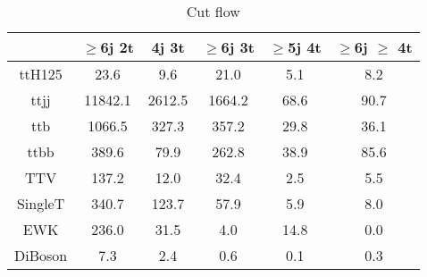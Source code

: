 \documentclass{article}
\begin{document}
        \begin{table*}[htbp]
        \begin{center}
\label{tab:cutflow}
\scriptsize{
\begin{tabular}{| c| c| c| c| c| c| }
\hline
 & $\ge$6j 2t  & 4j 3t  & $\ge$6j 3t  & $\ge$5j 4t  & $\ge$6j $\ge$ 4t \\ \hline
ttH125 &  23.6  &  9.6  &  21.0  &  5.1  &  8.2 \\
ttjj &  11842.1  &  2612.5  &  1664.2  &  68.6  &  90.7 \\
ttb &  1066.5  &  327.3  &  357.2  &  29.8  &  36.1 \\
ttbb &  389.6  &  79.9  &  262.8  &  38.9  &  85.6 \\
TTV &  137.2  &  12.0  &  32.4  &  2.5  &  5.5 \\
SingleT &  340.7  &  123.7  &  57.9  &  5.9  &  8.0 \\
EWK &  236.0  &  31.5  &  4.0  &  14.8  &  0.0 \\
DiBoson &  7.3  &  2.4  &  0.6  &  0.1  &  0.3 \\
\hline

        \end{tabular}
        }
        \caption{Cut flow}
        \end{center}
        \end{table*}

        
\end{document}

